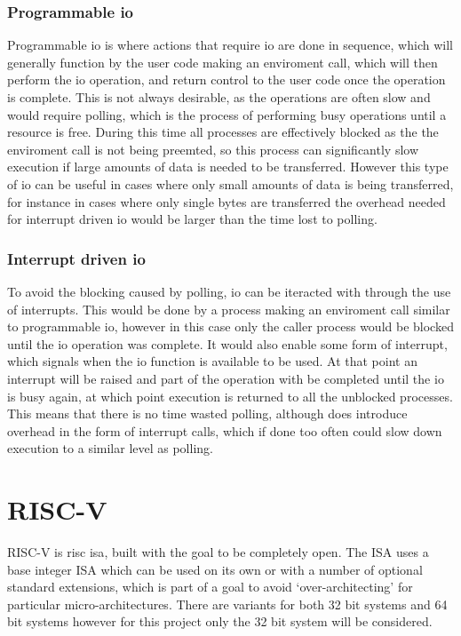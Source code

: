 \subsubsection{Programmable \ac{io}}
Programmable \ac{io} is where actions that require \ac{io} are done in sequence, which will generally function by the user code making an enviroment call, which will then perform the \ac{io} operation, and return control to the user code once the operation is complete. This is not always desirable, as the operations are often slow and would require polling, which is the process of performing busy operations until a resource is free. During this time all processes are effectively blocked as the the enviroment call is not being preemted, so this process can significantly slow execution if large amounts of data is needed to be transferred. However this type of \ac{io} can be useful in cases where only small amounts of data is being transferred, for instance in cases where only single bytes are transferred the overhead needed for interrupt driven \ac{io} would be larger than the time lost to polling.
\subsubsection{Interrupt driven \ac{io}}
To avoid the blocking caused by polling, \ac{io} can be iteracted with through the use of interrupts. This would be done by a process making an enviroment call similar to programmable \ac{io}, however in this case only the caller process would be blocked until the \ac{io} operation was complete. It would also enable some form of interrupt, which signals when the \ac{io} function is available to be used. At that point an interrupt will be raised and part of the operation with be completed until the \ac{io} is busy again, at which point execution is returned to all the unblocked processes. This means that there is no time wasted polling, although does introduce overhead in the form of interrupt calls, which if done too often could slow down execution to a similar level as polling.
\section{RISC-V}
RISC-V is \ac{risc} \ac{isa}, built with the goal to be completely open. The ISA uses a base integer ISA which can be used on its own or with a number of optional standard extensions, which is part of a goal to avoid `over-architecting' for particular micro-architectures. There are variants for both 32 bit systems and 64 bit systems however for this project only the 32 bit system will be considered.\cite{riscv_unpriv}

